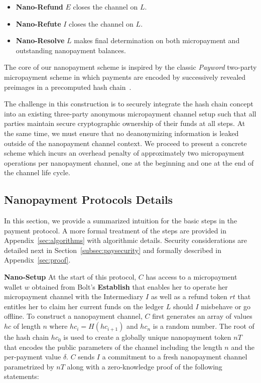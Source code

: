 \begin{itemize}
\item \textbf{Nano-Refund} $E$ closes the channel on $L$.
\item \textbf{Nano-Refute} $I$ closes the channel on $L$.
\item \textbf{Nano-Resolve} $L$ makes final determination on both micropayment
  and outstanding nanopayment balances.
\end{itemize}

The core of our nanopayment scheme is inspired by the classic \emph{Payword}
two-party micropayment scheme in which payments are encoded by successively
revealed preimages in a precomputed hash chain~\cite{rivest1996payword}.

The challenge in this construction is to securely integrate the hash chain
concept into an existing three-party anonymous micropayment channel setup such
that all parties maintain secure cryptographic ownership of their funds at all
steps. At the same time, we must ensure that no deanonymizing information is
leaked outside of the nanopayment channel context. We proceed to present a
concrete scheme which incurs an overhead penalty of approximately two
micropayment operations per nanopayment channel, one at the beginning and one at
the end of the channel life cycle.

\subsection{Nanopayment Protocols Details}
\label{sec:nanopaymentdetails}
In this section, we provide a summarized intuition for the basic steps in the
payment protocol. A more formal treatment of the steps are provided in
Appendix~\ref{sec:algorithms} with algorithmic details. Security considerations
are detailed next in Section~\ref{subsec:paysecurity} and formally described in
Appendix~\ref{sec:proof}.


\textbf{Nano-Setup} At the start of this protocol, $C$ has access to a
micropayment wallet $w$ obtained from Bolt's \textbf{Establish} that enables her
to operate her micropayment channel with the Intermediary $I$ as well as a
refund token $rt$ that entitles her to claim her current funds on the ledger $L$
should $I$ misbehave or go offline. To construct a nanopayment channel, $C$
first generates an array of values $hc$ of length $n$ where $hc_i = H(hc_{i+1})$
and $hc_n$ is a random number. The root of the hash chain $hc_0$ is used to
create a globally unique nanopayment token $nT$ that encodes the public
parameters of the channel including the length $n$ and the per-payment value
$\delta$. $C$ sends $I$ a commitment to a fresh nanopayment channel parametrized
by $nT$ along with a zero-knowledge proof of the following statements:

